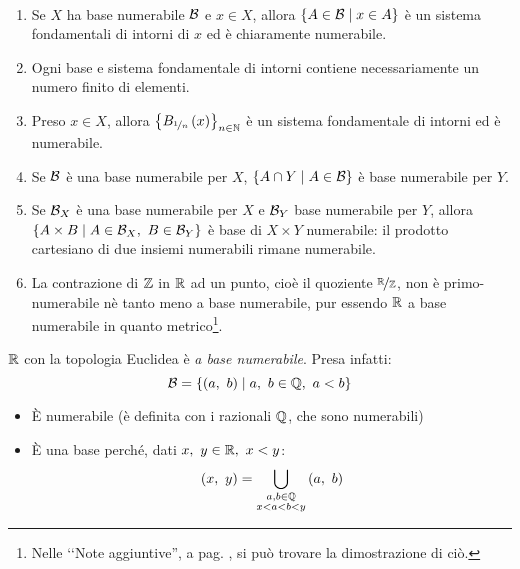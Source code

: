 \begin{demonstration}~{}
\begin{enumerate}[label=\Roman*]
	\item Se $X$ ha base numerabile $\mathcal{B}$ e $x\in X$, allora $\left\{A\in \mathcal{B}\mid x\in A\right\}$ è un sistema fondamentali di intorni di $x$ ed è chiaramente numerabile.
	\item Ogni base e sistema fondamentale di intorni contiene necessariamente un numero finito di elementi.
	\item Preso $x\in X$, allora $\left\{B_{\nicefrac{1}{n}}\left(x\right)\right\}_{n\in\mathbb{N}}$ è un sistema fondamentale di intorni ed è numerabile.
	\item Se $\mathcal{B}$ è una base numerabile per $X$, $\left\{A\cap Y\mid A\in \mathcal{B}\right\}$ è base numerabile per $Y$.
	\item Se $\mathcal{B}_X$ è una base numerabile per $X$ e $\mathcal{B}_Y$ base numerabile per $Y$, allora $\left\{A\times B\mid A\in \basis_X,\ B\in\basis_Y\right\}$ è base di $X\times Y$ numerabile: il prodotto cartesiano di due insiemi numerabili rimane numerabile.
	\item La contrazione di $\mathbb{Z}$ in $\mathbb{R}$ ad un punto, cioè il quoziente $\nicefrac{\mathbb{R}}{\mathbb{Z}}$, non è primo-numerabile nè tanto meno a base numerabile, pur essendo $\mathbb{R}$ a base numerabile in quanto metrico\footnote{Nelle ‘‘Note aggiuntive'', a pag. \pageref{dimostrazionenonnumerabilità}, si può trovare la dimostrazione di ciò.}.
\end{enumerate}
\end{demonstration}
\begin{example}
	$\mathbb{R}$ con la topologia Euclidea è \textit{a base numerabile}. Presa infatti:
	\begin{equation*}
		\mathcal{B}=\left\{\left(a,\ b\right)\mid a,\ b\in \mathbb{Q},\ a<b\right\}
	\end{equation*}
	\begin{itemize}
		\item È numerabile (è definita con i razionali $\mathbb{Q}$, che sono numerabili)
		\item È una base perché, dati $x,\ y\in\realset,\ x<y$:
		\begin{equation*}
			\left(x,\ y\right)=\union_{\substack{a, b\in\rationalset\\ x<a<b<y}}\left(a,\ b\right)
		\end{equation*}
	\end{itemize}
\end{example}
